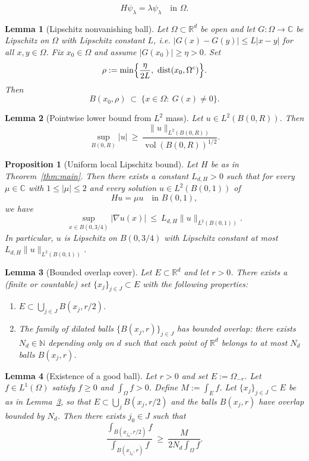\documentclass[10pt,a4paper]{amsart}
\newtheorem{lem}{Lemma}
\newtheorem{prp}{Proposition}
\newcommand{\C}{\mathbb{C}}
\newcommand{\N}{\mathbb{N}}
\newcommand{\R}{\mathbb{R}}
\newcommand{\dist}{\operatorname{dist}}
\newcommand{\vol}{\operatorname{vol}}
\begin{document}
\begin{equation}\label{eq:eigen}
H\psi_\lambda = \lambda\psi_\lambda\quad\text{in }\Omega.
\end{equation}

\begin{lem}[Lipschitz nonvanishing ball]\label{lem:lipschitz-ball}
Let $\Omega\subset\R^d$ be open and let $G:\Omega\to\C$ be Lipschitz on $\Omega$ with Lipschitz constant $L$, i.e.
$|G(x)-G(y)|\le L|x-y|$ for all $x,y\in\Omega$.
Fix $x_0\in\Omega$ and assume $|G(x_0)|\ge \eta>0$.
Set
$$
\rho := \min\Bigl\{\frac{\eta}{2L},\ \dist(x_0,\Omega^c)\Bigr\}.
$$
Then
$$
B(x_0,\rho)\ \subset\ \{x\in\Omega:\ G(x)\neq 0\}.
$$
\end{lem}

\begin{lem}[Pointwise lower bound from $L^2$ mass]\label{lem:L2-to-Linfty}
Let $u\in L^2(B(0,R))$. Then
$$
\sup_{B(0,R)} |u|\ \ge\ \frac{\|u\|_{L^2(B(0,R))}}{\vol(B(0,R))^{1/2}}.
$$
\end{lem}

\begin{prp}[Uniform local Lipschitz bound]\label{prp:uniform-lip}
Let $H$ be as in Theorem~\ref{thm:main}.
Then there exists a constant $L_{d,H}>0$ such that for every $\mu\in\C$ with $1\le|\mu|\le 2$
and every solution $u\in L^2(B(0,1))$ of
$$
Hu = \mu u\quad\text{in }B(0,1),
$$
we have
$$
\sup_{x\in B(0,3/4)}|\nabla u(x)|\ \le\ L_{d,H} \|u\|_{L^2(B(0,1))}.
$$
In particular, $u$ is Lipschitz on $B(0,3/4)$ with Lipschitz constant at most
$L_{d,H}\|u\|_{L^2(B(0,1))}$.
\end{prp}

\begin{lem}[Bounded overlap cover]\label{lem:cover}
Let $E\subset\R^d$ and let $r>0$.
There exists a (finite or countable) set $\{x_j\}_{j\in J}\subset E$ with the following properties:
\begin{enumerate}
\item $E\subset \bigcup_{j\in J} B(x_j,r/2)$.
\item The family of dilated balls $\{B(x_j,r)\}_{j\in J}$ has bounded overlap: there exists $N_d\in\N$ depending only on $d$ such that each point of $\R^d$ belongs to at most $N_d$ balls $B(x_j,r)$.
\end{enumerate}
\end{lem}

\begin{lem}[Existence of a good ball]\label{lem:good-ball}
Let $r>0$ and set $E := \Omega_{-r}$.
Let $f\in L^1(\Omega)$ satisfy $f\ge 0$ and $\int_\Omega f>0$.
Define $M := \int_E f$.
Let $\{x_j\}_{j\in J}\subset E$ be as in Lemma~\ref{lem:cover}, so that $E\subset \bigcup_{j} B(x_j,r/2)$ and the balls $B(x_j,r)$ have overlap bounded by $N_d$.
Then there exists $j_0\in J$ such that
\begin{equation}\label{eq:ratio}
\frac{\int_{B(x_{j_0},r/2)} f}{\int_{B(x_{j_0},r)} f}
\ \ge\
\frac{M}{2N_d \int_\Omega f}.
\end{equation}
\end{lem}
\end{document}
